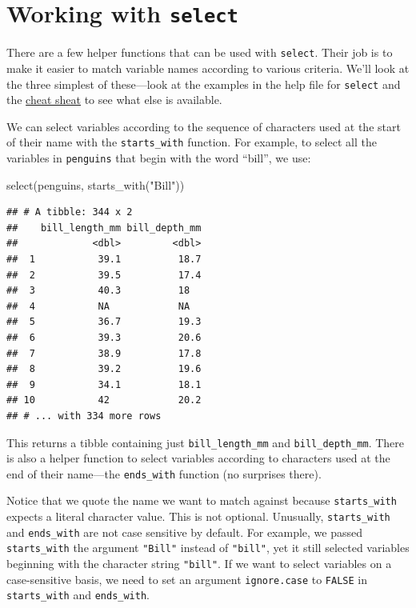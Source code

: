 \documentclass[
]{book}
\newenvironment{Shaded}{\begin{snugshade}}{\end{snugshade}}
\newcommand{\FunctionTok}[1]{\textcolor[rgb]{0.00,0.00,0.00}{#1}}
\newcommand{\NormalTok}[1]{#1}
\newcommand{\StringTok}[1]{\textcolor[rgb]{0.31,0.60,0.02}{#1}}
\begin{document}
\hypertarget{working-with-select}{%
\section{\texorpdfstring{Working with \texttt{select}}{Working with select}}\label{working-with-select}}

There are a few helper functions that can be used with \texttt{select}. Their job is to make it easier to match variable names according to various criteria. We'll look at the three simplest of these---look at the examples in the help file for \texttt{select} and the \href{https://github.com/rstudio/cheatsheets/raw/master/data-transformation.pdf}{cheat sheat} to see what else is available.

We can select variables according to the sequence of characters used at the start of their name with the \texttt{starts\_with} function. For example, to select all the variables in \texttt{penguins} that begin with the word ``bill'', we use:

\begin{Shaded}
\begin{Highlighting}[]
\FunctionTok{select}\NormalTok{(penguins, }\FunctionTok{starts\_with}\NormalTok{(}\StringTok{"Bill"}\NormalTok{))}
\end{Highlighting}
\end{Shaded}

\begin{verbatim}
## # A tibble: 344 x 2
##    bill_length_mm bill_depth_mm
##             <dbl>         <dbl>
##  1           39.1          18.7
##  2           39.5          17.4
##  3           40.3          18  
##  4           NA            NA  
##  5           36.7          19.3
##  6           39.3          20.6
##  7           38.9          17.8
##  8           39.2          19.6
##  9           34.1          18.1
## 10           42            20.2
## # ... with 334 more rows
\end{verbatim}

This returns a tibble containing just \texttt{bill\_length\_mm} and \texttt{bill\_depth\_mm}. There is also a helper function to select variables according to characters used at the end of their name---the \texttt{ends\_with} function (no surprises there).

Notice that we quote the name we want to match against because \texttt{starts\_with} expects a literal character value. This is not optional. Unusually, \texttt{starts\_with} and \texttt{ends\_with} are not case sensitive by default. For example, we passed \texttt{starts\_with} the argument \texttt{"Bill"} instead of \texttt{"bill"}, yet it still selected variables beginning with the character string \texttt{"bill"}. If we want to select variables on a case-sensitive basis, we need to set an argument \texttt{ignore.case} to \texttt{FALSE} in \texttt{starts\_with} and \texttt{ends\_with}.
\end{document}
